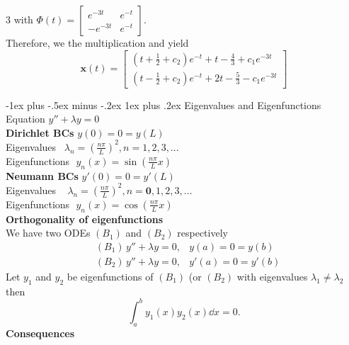 \documentclass[10pt,landscape]{article}
\makeatletter
\renewcommand{\subsubsection}{\@startsection{subsubsection}{3}{0mm}%
                                    {-1ex plus -.5ex minus -.2ex}%
                                    {1ex plus .2ex}%
                                    {\normalfont\small\bfseries}}
\makeatother
\begin{document}
\begin{multicols}{3}
    with $
    \Phi(t) =
    \begin{bmatrix}
    e^{-3t} & e^{-t} \\
    - e^{-3t} & e^{-t}
    \end{bmatrix}.$ \\[6pt]
    Therefore, we the multiplication and yield
    \[ \mathbf{x}(t)=
    \begin{bmatrix}
    \left(t+\frac{1}{2}+c_2\right)e^{-t} + t - \frac{4}{3} + c_1 e^{-3t} \\
    \left(t-\frac{1}{2}+c_2\right)e^{-t} + 2t - \frac{5}{3} - c_1 e^{-3t}
    \end{bmatrix}
    \]

    \subsubsection{Eigenvalues and Eigenfunctions}
        Equation $y'' + \lambda y = 0$ \\[6pt]
        \textbf{Dirichlet BCs} $y(0) = 0 = y(L)$ \\[6pt]
        Eigenvalues \quad \,\,\,$\displaystyle \lambda_n = \left(\frac{n\pi}{L}\right)^2, n = 1,2,3,...$    \\[6pt]
        Eigenfunctions \,\,$\displaystyle y_n(x) = \sin\left(\frac{n\pi}{L}x\right) $    \\[6pt]
        \textbf{Neumann BCs} $y'(0) = 0 = y'(L)$ \\[6pt]
        Eigenvalues \quad \,\, \,$\displaystyle \lambda_n = \left(\frac{n\pi}{L}\right)^2, n = \textbf{0},1,2,3,...$    \\[6pt]
        Eigenfunctions \,\,$\displaystyle y_n(x) = \cos\left(\frac{n\pi}{L}x\right) $\\[6pt]
        \textbf{Orthogonality of eigenfunctions}\\
        We have two ODEs $(B_1)$ and $(B_2)$ respectively
        \begin{align*}
        &(B_1)\, y'' + \lambda y=0,&y(a)=0 =y(b)\\
        &(B_2)\, y'' + \lambda y=0,&y'(a) = 0=y'(b)
        \end{align*}
        Let $y_1$ and $y_2$ be eigenfunctions of $(B_1)$ (or $(B_2)$ with eigenvalues $\lambda_1\ne\lambda_2$ then
        \[\int_a^by_1(x)y_2(x)\dd x=0.\]
        \textbf{Consequences}
\end{multicols}
\end{document}
